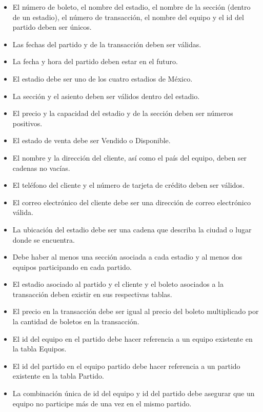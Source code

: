 \begin{itemize}
    \item El número de boleto, el nombre del estadio, el nombre de la sección (dentro de un estadio), el número de transacción, el nombre del equipo y el id del partido deben ser únicos.
    \item Las fechas del partido y de la transacción deben ser válidas.
    \item La fecha y hora del partido deben estar en el futuro.
    \item El estadio debe ser uno de los cuatro estadios de México.
    \item La sección y el asiento deben ser válidos dentro del estadio.
    \item El precio y la capacidad del estadio y de la sección deben ser números positivos.
    \item El estado de venta debe ser Vendido o Disponible.
    \item El nombre y la dirección del cliente, así como el país del equipo, deben ser cadenas no vacías.
    \item El teléfono del cliente y el número de tarjeta de crédito deben ser válidos.
    \item El correo electrónico del cliente debe ser una dirección de correo electrónico válida.
    \item La ubicación del estadio debe ser una cadena que describa la ciudad o lugar donde se encuentra.
    \item Debe haber al menos una sección asociada a cada estadio y al menos dos equipos participando en cada partido.
    \item El estadio asociado al partido y el cliente y el boleto asociados a la transacción deben existir en sus respectivas tablas.
    \item El precio en la transacción debe ser igual al precio del boleto multiplicado por la cantidad de boletos en la transacción.
    \item El id del equipo en el partido debe hacer referencia a un equipo existente en la tabla Equipos.
    \item El id del partido en el equipo partido debe hacer referencia a un partido existente en la tabla Partido.
    \item La combinación única de id del equipo y id del partido debe asegurar que un equipo no participe más de una vez en el mismo partido.
\end{itemize}

